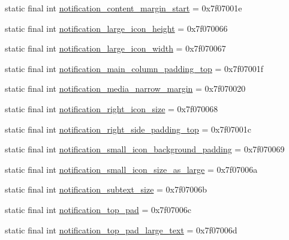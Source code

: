 \begin{CompactItemize}
\item 
static final int \hyperlink{classandroid_1_1support_1_1graphics_1_1drawable_1_1_r_1_1dimen_ec0d56f31c2b57e30cc9371b5cb635a1}{notification\_\-content\_\-margin\_\-start} = 0x7f07001e
\item 
static final int \hyperlink{classandroid_1_1support_1_1graphics_1_1drawable_1_1_r_1_1dimen_8d96fc70d40e23da29f1f37346cff69c}{notification\_\-large\_\-icon\_\-height} = 0x7f070066
\item 
static final int \hyperlink{classandroid_1_1support_1_1graphics_1_1drawable_1_1_r_1_1dimen_167f270a169b50d9ce8c79fa4dda93ae}{notification\_\-large\_\-icon\_\-width} = 0x7f070067
\item 
static final int \hyperlink{classandroid_1_1support_1_1graphics_1_1drawable_1_1_r_1_1dimen_a8366b7adc3bae408d29a69fa94d702f}{notification\_\-main\_\-column\_\-padding\_\-top} = 0x7f07001f
\item 
static final int \hyperlink{classandroid_1_1support_1_1graphics_1_1drawable_1_1_r_1_1dimen_07bb6ec4e0578afa15ce916af47f4b2f}{notification\_\-media\_\-narrow\_\-margin} = 0x7f070020
\item 
static final int \hyperlink{classandroid_1_1support_1_1graphics_1_1drawable_1_1_r_1_1dimen_b30c72014803a9630afe9c133b74caf0}{notification\_\-right\_\-icon\_\-size} = 0x7f070068
\item 
static final int \hyperlink{classandroid_1_1support_1_1graphics_1_1drawable_1_1_r_1_1dimen_3c3cddc144bcc917e7481c50554937f2}{notification\_\-right\_\-side\_\-padding\_\-top} = 0x7f07001c
\item 
static final int \hyperlink{classandroid_1_1support_1_1graphics_1_1drawable_1_1_r_1_1dimen_197d04281bab9eed92203628decd5c85}{notification\_\-small\_\-icon\_\-background\_\-padding} = 0x7f070069
\item 
static final int \hyperlink{classandroid_1_1support_1_1graphics_1_1drawable_1_1_r_1_1dimen_e4f53c617b127db9157d0507d456567e}{notification\_\-small\_\-icon\_\-size\_\-as\_\-large} = 0x7f07006a
\item 
static final int \hyperlink{classandroid_1_1support_1_1graphics_1_1drawable_1_1_r_1_1dimen_1621818bdf28a9bcc9396ca928c3128a}{notification\_\-subtext\_\-size} = 0x7f07006b
\item 
static final int \hyperlink{classandroid_1_1support_1_1graphics_1_1drawable_1_1_r_1_1dimen_d95a648ab0750919d79268e0d18a3de2}{notification\_\-top\_\-pad} = 0x7f07006c
\item 
static final int \hyperlink{classandroid_1_1support_1_1graphics_1_1drawable_1_1_r_1_1dimen_4bb08cb1ea54f78d787366a5e635fb7a}{notification\_\-top\_\-pad\_\-large\_\-text} = 0x7f07006d
\end{CompactItemize}



